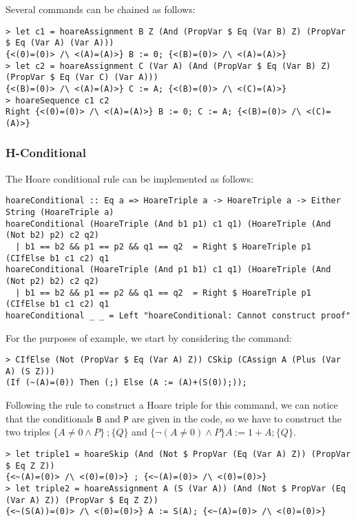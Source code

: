 \documentclass{article}
\begin{document}
Several commands can be chained as follows:

\begin{lstlisting}
> let c1 = hoareAssignment B Z (And (PropVar $ Eq (Var B) Z) (PropVar $ Eq (Var A) (Var A)))
{<(0)=(0)> /\ <(A)=(A)>} B := 0; {<(B)=(0)> /\ <(A)=(A)>}
> let c2 = hoareAssignment C (Var A) (And (PropVar $ Eq (Var B) Z) (PropVar $ Eq (Var C) (Var A)))
{<(B)=(0)> /\ <(A)=(A)>} C := A; {<(B)=(0)> /\ <(C)=(A)>}
> hoareSequence c1 c2
Right {<(0)=(0)> /\ <(A)=(A)>} B := 0; C := A; {<(B)=(0)> /\ <(C)=(A)>}
\end{lstlisting}

\subsubsection{H-Conditional}

The Hoare conditional rule can be implemented as follows:

\begin{lstlisting}
hoareConditional :: Eq a => HoareTriple a -> HoareTriple a -> Either String (HoareTriple a)
hoareConditional (HoareTriple (And b1 p1) c1 q1) (HoareTriple (And (Not b2) p2) c2 q2)
  | b1 == b2 && p1 == p2 && q1 == q2  = Right $ HoareTriple p1 (CIfElse b1 c1 c2) q1
hoareConditional (HoareTriple (And p1 b1) c1 q1) (HoareTriple (And (Not p2) b2) c2 q2)
  | b1 == b2 && p1 == p2 && q1 == q2  = Right $ HoareTriple p1 (CIfElse b1 c1 c2) q1
hoareConditional _ _ = Left "hoareConditional: Cannot construct proof"
\end{lstlisting}

For the purposes of example, we start by considering the command:

\begin{lstlisting}
> CIfElse (Not (PropVar $ Eq (Var A) Z)) CSkip (CAssign A (Plus (Var A) (S Z)))
(If (~(A)=(0)) Then (;) Else (A := (A)+(S(0));));
\end{lstlisting}

Following the rule to construct a Hoare triple for this command, we can notice that the conditionals \texttt{B} and \texttt{P} are given in the code, so we have to construct the two triples $\{A \neq 0 \land P\} \ ; \{Q\}$ and $\{\neg(A \neq 0) \land P\} A := 1 + A; \{Q\}$.

\begin{lstlisting}
> let triple1 = hoareSkip (And (Not $ PropVar (Eq (Var A) Z)) (PropVar $ Eq Z Z))
{<~(A)=(0)> /\ <(0)=(0)>} ; {<~(A)=(0)> /\ <(0)=(0)>}
> let triple2 = hoareAssignment A (S (Var A)) (And (Not $ PropVar (Eq (Var A) Z)) (PropVar $ Eq Z Z))
{<~(S(A))=(0)> /\ <(0)=(0)>} A := S(A); {<~(A)=(0)> /\ <(0)=(0)>}
\end{lstlisting}
\end{document}
